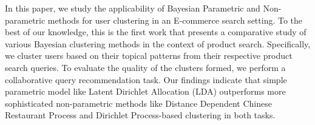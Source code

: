 In this paper, we study the applicability of Bayesian Parametric and Non-parametric methods for user clustering in an E-commerce search setting. To the best of our knowledge, this is the first work that presents a comparative study of various Bayesian clustering methods in the context of product search. Specifically, we cluster users based on their topical patterns from their respective product search queries. To evaluate the quality of the clusters formed, we perform a collaborative query recommendation task. Our findings indicate that simple parametric model like Latent Dirichlet Allocation (LDA) outperforms more sophisticated non-parametric methods like Distance Dependent Chinese Restaurant Process and Dirichlet Process-based clustering in both tasks.
